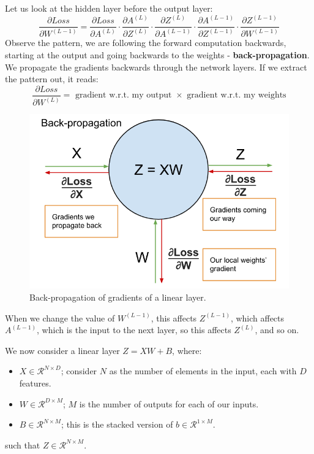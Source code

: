 \documentclass[11pt]{article}
\begin{document}
Let us look at the hidden layer before the output layer:
\[
  \frac{\partial Loss}{\partial W^{(L - 1)}} = \frac{\partial Loss}{\partial A^{(L)}} \cdot \frac{\partial A^{(L)}}{\partial Z^{(L)}} \cdot \frac{\partial Z^{(L)}}{\partial A^{(L - 1)}} \cdot \frac{\partial A^{(L - 1)}}{\partial Z^{(L - 1)}} \cdot \frac{\partial Z^{(L - 1)}}{\partial W^{(L - 1)}}
\]
Observe the pattern, we are following the forward computation backwards, starting at the output and going backwards to the weights - \textbf{back-propagation}.
We propagate the gradients backwards through the network layers.
If we extract the pattern out, it reads:
\[
  \frac{\partial Loss}{\partial W^{(L)}}  = \text{ gradient w.r.t. my output } \times \text{ gradient w.r.t. my weights}
\]

\begin{figure}[htb!]
  \centering
  \caption{Back-propagation of gradients of a linear layer.}
  \includegraphics[scale=0.4]{backpropagation}
\end{figure}

When we change the value of $W^{(L - 1)}$, this affects $Z^{(L - 1)}$, which affects $A^{(L - 1)}$, which is the input to the next layer, so this affects $Z^{(L)}$, and so on.

We now consider a linear layer $Z = XW + B$, where:
  \begin{itemize}
    \item $X \in \mathcal{R}^{N \times D}$; consider $N$ as the number of elements in the input, each with $D$ features.
    \item $W \in \mathcal{R}^{D \times M}$; $M$ is the number of outputs for each of our inputs.
    \item $B \in \mathcal{R}^{N \times M}$; this is the stacked version of $b \in \mathcal{R}^{1 \times M}$.
  \end{itemize}
such that $Z \in \mathcal{R}^{N  \times M}$.
\end{document}
